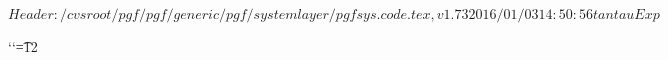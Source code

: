 %
%
%

\ProvidesPackageRCS[v\pgfversion] $Header: /cvsroot/pgf/pgf/generic/pgf/systemlayer/pgfsys.code.tex,v 1.73 2016/01/03 14:50:56 tantau Exp $




\def\pgfset{\pgfqkeys{/pgf}}

\newif\ifpgfpicture


%
% 
{\catcode`\catcode`\t=12\gdef\Pgf@geT#1pt{#1}}

\def\pgf@sys@tonumber#1{\expandafter\Pgf@geT\the#1}

\def\pgf@sys@bp@correct#1{#1=0.99627#1}

\def\pgf@sys@bp#1{%
  {%
    \pgf@x=#1\relax%
    \pgf@x=0.99627\pgf@x%
    \edef\temp{\expandafter\Pgf@geT\the\pgf@x\space}%
    \pgfutil@toks@\expandafter\expandafter\expandafter{\expandafter\pgfsysprotocol@currentprotocol\temp}%
    \xdef\pgfsysprotocol@currentprotocol{\the\pgfutil@toks@}%
  }%
}
\def\pgf@sys@pt#1{%
  {%
    \pgf@x=#1\relax%
    \edef\temp{\expandafter\Pgf@geT\the\pgf@x\space}%
    \pgfutil@toks@\expandafter\expandafter\expandafter{\expandafter\pgfsysprotocol@currentprotocol\temp}%
    \xdef\pgfsysprotocol@currentprotocol{\the\pgfutil@toks@}%
  }%
}


\newdimen\pgf@x
\newdimen\pgf@y
\newdimen\pgf@xa
\newdimen\pgf@ya
\newdimen\pgf@xb
\newdimen\pgf@yb
\newdimen\pgf@xc
\newdimen\pgf@yc

\newwrite\w@pgf@writea
\newread\r@pgf@reada
\let\pgfutil@inputcheck=\r@pgf@reada

\newcount\c@pgf@counta
\newcount\c@pgf@countb
\newcount\c@pgf@countc
\newcount\c@pgf@countd

\newtoks\t@pgf@toka
\newtoks\t@pgf@tokb
\newtoks\t@pgf@tokc

\let\pgfmath@x\pgf@x
\let\pgfmath@xa\pgf@xa
\let\pgfmath@xb\pgf@xb
\let\pgfmath@xc\pgf@xc

